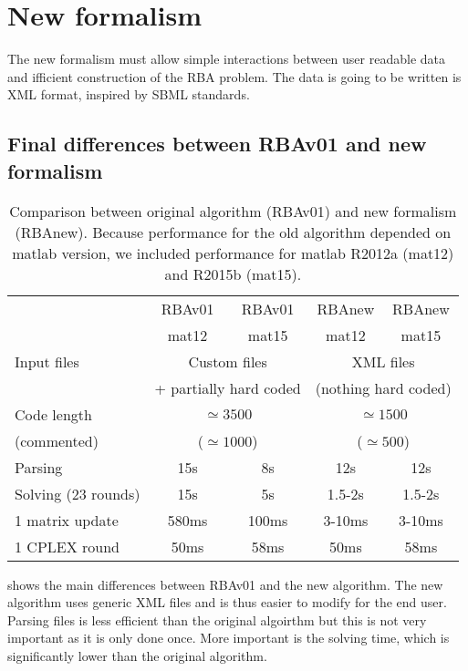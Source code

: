 \section{New formalism}

The new formalism must allow simple interactions between user readable data and ifficient construction of the RBA problem. The data is going to be written is XML format, inspired by SBML standards.

\subsection{Final differences between RBAv01 and new formalism}

\begin{table}[!h]
  \centering
  \begin{tabular}{|l|c|c|c|c|}
    \hline
           & RBAv01 & RBAv01 & RBAnew & RBAnew \\
           & mat12  & mat15  & mat12  & mat15 \\
    \hline
    Input files & \multicolumn{2}{c|}{Custom files} & \multicolumn{2}{c|}{XML files} \\
    & \multicolumn{2}{c|}{+ partially hard coded} & \multicolumn{2}{c|}{(nothing hard coded)} \\
    \hline
    Code length & \multicolumn{2}{c|}{$\simeq 3500$} & \multicolumn{2}{c|}{$\simeq 1500$} \\
    (commented) & \multicolumn{2}{c|}{($\simeq 1000$)} & \multicolumn{2}{c|}{($\simeq 500$)} \\
    \hline
    Parsing & 15s & 8s & 12s & 12s \\
    \hline
    Solving (23 rounds) & 15s & 5s & 1.5-2s & 1.5-2s \\
    \hline
    1 matrix update & 580ms & 100ms & 3-10ms & 3-10ms \\
    \hline
    1 CPLEX round & 50ms & 58ms & 50ms & 58ms \\
    \hline
  \end{tabular}
  \caption{Comparison between original algorithm (RBAv01) and new formalism (RBAnew). Because performance for the old algorithm depended on matlab version, we included performance for matlab R2012a (mat12) and R2015b (mat15).}
  \label{tab:new_old_comparison}
\end{table}

 shows the main differences between RBAv01 and the new algorithm. The new algorithm uses generic XML files and is thus easier to modify for the end user. Parsing files is less efficient than the original algoirthm but this is not very important as it is only done once. More important is the solving time, which is significantly lower than the original algorithm.

